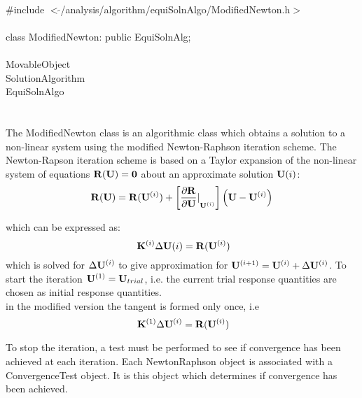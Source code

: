 
   \\
\indent \#include $<\tilde{
}$/analysis/algorithm/equiSolnAlgo/ModifiedNewton.h$>$  \\ 

  \\
\indent class ModifiedNewton: public EquiSolnAlg;  \\

 \\
\indent MovableObject \\
\indent\indent SolutionAlgorithm \\
\indent\indent\indent EquiSolnAlgo \\
\indent\indent\indent{} \\

 \\ 
\indent The ModifiedNewton class is an algorithmic class which obtains a
solution to a non-linear system using the modified Newton-Raphson iteration
scheme. The Newton-Rapson iteration scheme is based on a Taylor expansion of the
non-linear system of equations ${\bf R}({\bf U}) = {\bf 0}$ about an approximate
solution ${\bf U}{(i)}$:
\begin{equation} 
{\bf R}({\bf U}) = 
{\bf R}({\bf U}^{(i)}) +
\left[ {\frac{\partial {\bf R}}{\partial {\bf U}} \vert}_{{\bf U}^{(i)}}\right]
\left( {\bf U} - {\bf U}^{(i)} \right) 
\end{equation}

\noindent which can be expressed as:
\begin{equation} \
{\bf K}^{(i)}  \Delta {\bf U}{(i)} = {\bf R}({\bf U}^{(i)})
\end{equation}
which is solved for $\Delta {\bf U}^{(i)}$ to give approximation for
${\bf U}^{(i+1)} = {\bf U}^{(i)} + \Delta {\bf U}^{(i)}$. To start the
iteration ${\bf U}^{(1)} = {\bf U}_{trial}$, i.e. the current trial
response quantities are chosen as initial response quantities. \\

in the modified version the tangent is formed only once, i.e
\begin{equation} \
{\bf K}^{(1)}  \Delta {\bf U}^{(i)} = {\bf R}({\bf U}^{(i)})
\end{equation}

To stop the iteration, a test must be performed to see if convergence
has been achieved at each iteration. Each NewtonRaphson object is
associated with a ConvergenceTest object. It is this object which
determines if convergence has been achieved. \\

